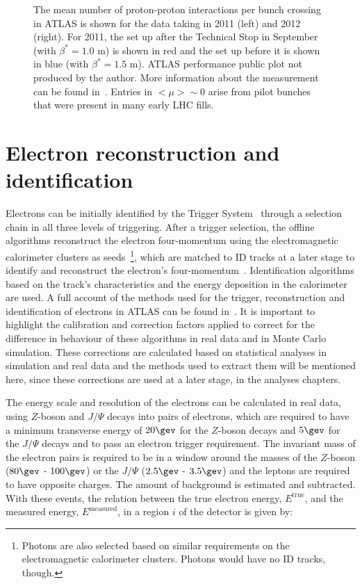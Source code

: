 \begin{figure}[ht]
\centering
{}
\caption{The mean number of proton-proton interactions per bunch crossing in ATLAS is shown for the data taking in 2011 (left) and 2012 (right). For 2011, the set up after the Technical Stop in September (with $\beta^{*} = 1.0$ m) is shown in red and the set up before it is shown in blue (with $\beta^{*} = 1.5$ m). ATLAS performance public plot not produced by the author. More information about the measurement can be found in~\cite{lumi}. Entries in $<\mu> \sim 0$ arise from pilot bunches that were present in many early LHC fills.}
\label{fig:pileup}
\end{figure}


\section{Electron reconstruction and identification}
\label{sec:atlas_electron}

Electrons can be initially identified by the Trigger System~\cite{atlastrigger} through a selection chain in all three levels of triggering.
After a trigger selection, the offline algorithms reconstruct the electron four-momentum using the electromagnetic calorimeter clusters as seeds~\footnote{Photons
are also selected based on similar requirements on the electromagnetic calorimeter clusters. Photons would have no ID tracks, though.}, which are matched to ID tracks
at a later stage to identify and reconstruct the electron's four-momentum~\cite{electron2010}.
Identification algorithms based on the track's characteristics and the energy deposition
in the calorimeter are used. A full account of the methods used for the trigger, reconstruction and identification of electrons in ATLAS can be found in~\cite{electron2010}.
It is important to highlight the calibration and correction factors applied to correct for the difference in behaviour of these algorithms in real data and in Monte Carlo
simulation. These corrections are calculated based on statistical analyses in simulation and real data and the methods used to extract them will be mentioned here, since
these corrections are used at a later stage, in the analyses chapters.

The energy scale and resolution of the electrons can be calculated in real data, using $Z$-boson and $J/\Psi$ decays into pairs of electrons, which are required
to have a minimum transverse energy of $20\gev$ for the $Z$-boson decays and $5\gev$ for the $J/\Psi$ decays and to pass an electron trigger requirement.
The invariant mass of the electron pairs is required to
be in a window around the masses of the $Z$-boson ($80\gev$ - $100\gev$) or the $J/\Psi$ ($2.5\gev$ - $3.5\gev$) and the leptons are required to have opposite
charges. The amount of background is estimated and subtracted. With these events, the relation between the true electron energy, $E^{\textrm{true}}$,
and the measured energy, $E^{\textrm{measured}}$, in a region $i$ of the detector is given by:

